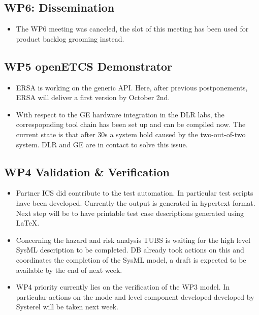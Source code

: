 \documentclass[a4paper, 11pt]{article}
\begin{document}
\subsection{WP6: Dissemination}
\begin{itemize}
\item The WP6 meeting was canceled, the slot of this meeting has been used for product backlog grooming instead.
\end{itemize}

\subsection{WP5 openETCS Demonstrator}
\begin{itemize}

\item ERSA is working on the generic API. Here, after previous postponements, ERSA will deliver a first version by October 2nd.
\item With respect to the GE hardware integration in the DLR labs, the correspopnding tool chain has been set up and can be compiled now. The current state is that after 30s a system hold caused by the two-out-of-two system. DLR and GE are in contact to solve this issue.
\end{itemize}

\subsection{WP4 Validation \& Verification}
\begin{itemize}
\item Partner ICS did contribute to the test automation. In particular test scripts have been developed. Currently the output is generated in hypertext format. Next step will be to have printable test case descriptions generated using LaTeX.
\item Concerning the hazard and risk analysis TUBS is waiting for the high level SysML description to be completed. DB already took actions on this and coordinates the completion of the SysML model, a draft is expected to be available by the end of next week.
\item WP4 priority currently lies on the verification of the WP3 model. In particular actions on the mode and level component developed developed by Systerel will be taken next week.
\end{itemize}
\end{document}
